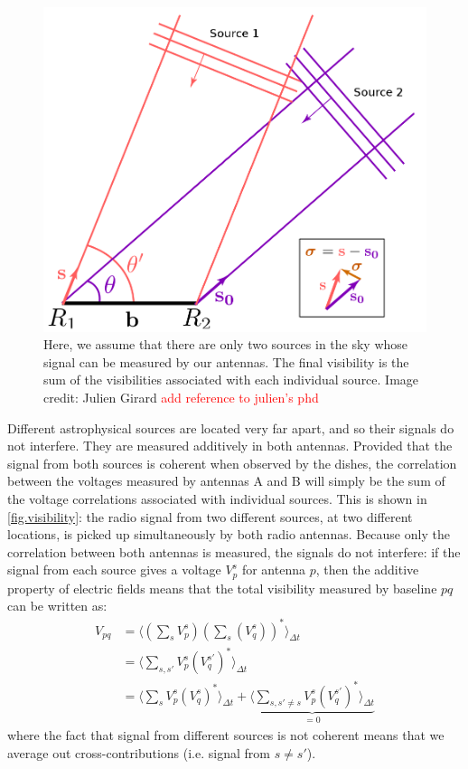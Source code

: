 \begin{figure}[ht]
\centering
\includegraphics[width=.5\textwidth]{images/visibility-measure.png}
\caption{\label{fig.visibility.measure} Here, we assume that there are only two sources in the sky whose signal can be measured by our antennas. The final visibility is the sum of the visibilities associated with each individual source. Image credit: Julien Girard \textcolor{red}{add reference to julien's phd}}
\end{figure}

\pg
Different astrophysical sources are located very far apart, and so their signals do not interfere. They are measured additively in both antennas. Provided that the signal from both sources is coherent when observed by the dishes, the correlation between the voltages measured by antennas A and B will simply be the sum of the voltage correlations associated with individual sources. This is shown in \cref{fig.visibility}: the radio signal from two different sources, at two different locations, is picked up simultaneously by both radio antennas. Because only the correlation between both antennas is measured, the signals do not interfere: if the signal from each source gives a voltage $V_{p}^s$ for antenna $p$, then the additive property of electric fields means that the total visibility measured by baseline $pq$ can be written as:
\begin{align}
V_{pq}  &= \langle \left(\sum_{s} V_{p}^s\right) \left(\sum_{s} (V_{q}^s)\right)^*  \rangle_{\Delta t} \\
        &= \langle \sum_{s,s'} V_{p}^s (V_q^{s'})^*  \rangle_{\Delta t}\\
        &= \langle \sum_s V_{p}^s (V_q^{s})^* \rangle_{\Delta t} + \underbrace{\langle \sum_{s,s'\ne s} V_{p}^s (V_q^{s'})^* \rangle_{\Delta t}}_{=0} \label{eq.spatial.incor}
\end{align}
where the fact that signal from different sources is not coherent means that we average out cross-contributions (i.e. signal from $s\ne s'$). 

